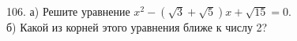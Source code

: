 106. а) Решите уравнение $x^2-(\sqrt{3}+\sqrt{5})x+\sqrt{15}=0.$\\
б) Какой из корней этого уравнения ближе к числу 2?\\
